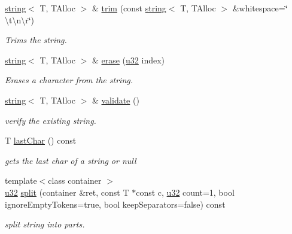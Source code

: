 \begin{DoxyCompactItemize}
\hyperlink{classirr_1_1core_1_1string}{string}$<$ T, T\+Alloc $>$ \& \hyperlink{classirr_1_1core_1_1string_a4ff8317af3774b4eaf5ea9791c3dc3e9}{trim} (const \hyperlink{classirr_1_1core_1_1string}{string}$<$ T, T\+Alloc $>$ \&whitespace=\char`\"{} \textbackslash{}t\textbackslash{}n\textbackslash{}r\char`\"{})
\begin{DoxyCompactList}\small\item\em Trims the string. \end{DoxyCompactList}\item 
\hyperlink{classirr_1_1core_1_1string}{string}$<$ T, T\+Alloc $>$ \& \hyperlink{classirr_1_1core_1_1string_ab63649dfea4751439fa09c481b705006}{erase} (\hyperlink{namespaceirr_a0416a53257075833e7002efd0a18e804}{u32} index)
\begin{DoxyCompactList}\small\item\em Erases a character from the string. \end{DoxyCompactList}\item 
\hyperlink{classirr_1_1core_1_1string}{string}$<$ T, T\+Alloc $>$ \& \hyperlink{classirr_1_1core_1_1string_acf96202ede3fc24bc21d9d0167627224}{validate} ()\hypertarget{classirr_1_1core_1_1string_acf96202ede3fc24bc21d9d0167627224}{}\label{classirr_1_1core_1_1string_acf96202ede3fc24bc21d9d0167627224}

\begin{DoxyCompactList}\small\item\em verify the existing string. \end{DoxyCompactList}\item 
T \hyperlink{classirr_1_1core_1_1string_a547bd8190dcc4e668f853d4d02f322ae}{last\+Char} () const \hypertarget{classirr_1_1core_1_1string_a547bd8190dcc4e668f853d4d02f322ae}{}\label{classirr_1_1core_1_1string_a547bd8190dcc4e668f853d4d02f322ae}

\begin{DoxyCompactList}\small\item\em gets the last char of a string or null \end{DoxyCompactList}\item 
{\footnotesize template$<$class container $>$ }\\\hyperlink{namespaceirr_a0416a53257075833e7002efd0a18e804}{u32} \hyperlink{classirr_1_1core_1_1string_a1824ecd275e5ae48dcf74f63bb4fff0a}{split} (container \&ret, const T $\ast$const c, \hyperlink{namespaceirr_a0416a53257075833e7002efd0a18e804}{u32} count=1, bool ignore\+Empty\+Tokens=true, bool keep\+Separators=false) const 
\begin{DoxyCompactList}\small\item\em split string into parts. \end{DoxyCompactList}\end{DoxyCompactItemize}


